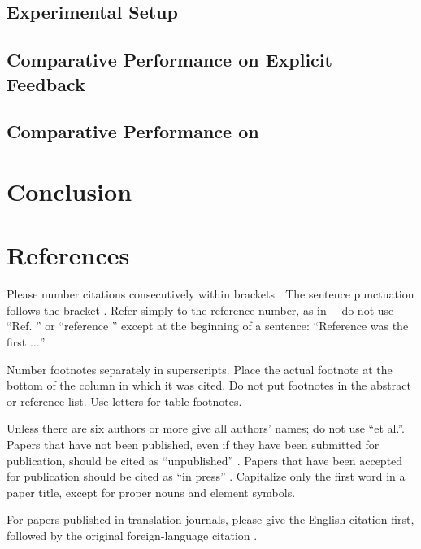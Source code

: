 \documentclass[conference]{IEEEtran}
\begin{document}
\subsection{Experimental Setup}

\subsection{Comparative Performance on Explicit Feedback}

\subsection{Comparative Performance on }


\section{Conclusion}\label{sec:conclusion}
\section*{References}

Please number citations consecutively within brackets \cite{b1}. The 
sentence punctuation follows the bracket \cite{b2}. Refer simply to the reference 
number, as in \cite{b3}---do not use ``Ref. \cite{b3}'' or ``reference \cite{b3}'' except at 
the beginning of a sentence: ``Reference \cite{b3} was the first $\ldots$''

Number footnotes separately in superscripts. Place the actual footnote at 
the bottom of the column in which it was cited. Do not put footnotes in the 
abstract or reference list. Use letters for table footnotes.

Unless there are six authors or more give all authors' names; do not use 
``et al.''. Papers that have not been published, even if they have been 
submitted for publication, should be cited as ``unpublished'' \cite{b4}. Papers 
that have been accepted for publication should be cited as ``in press'' \cite{b5}. 
Capitalize only the first word in a paper title, except for proper nouns and 
element symbols.

For papers published in translation journals, please give the English 
citation first, followed by the original foreign-language citation \cite{b6}.
\end{document}
